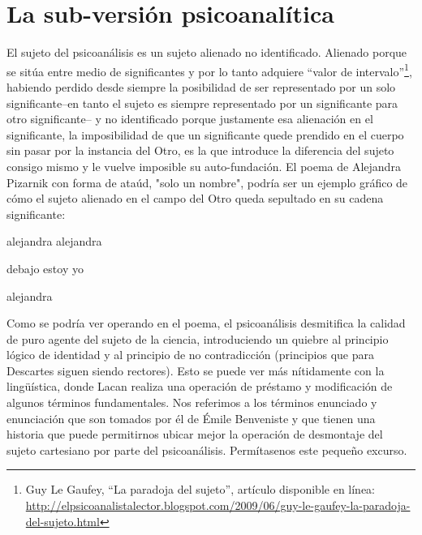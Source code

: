 \documentclass{book}
\begin{document}
\section{La sub-versión psicoanalítica}

El sujeto del psicoanálisis es un sujeto alienado no identificado.
Alienado porque se sitúa entre medio de significantes y por lo tanto
adquiere \enquote{valor de intervalo}\footnote{Guy Le Gaufey, \enquote{La paradoja del
  sujeto}, artículo disponible en línea:
  \url{http://elpsicoanalistalector.blogspot.com/2009/06/guy-le-gaufey-la-paradoja-del-sujeto.html}},
habiendo perdido desde siempre la posibilidad de ser representado por un
solo significante--en tanto el sujeto es siempre representado por un
significante para otro significante-- y no identificado porque
justamente esa alienación en el significante, la imposibilidad de que un
significante quede prendido en el cuerpo sin pasar por la instancia del
Otro, es la que introduce la diferencia del sujeto consigo mismo y le
vuelve imposible su auto-fundación. El poema de Alejandra Pizarnik con
forma de ataúd, "solo un nombre", podría ser un ejemplo gráfico de cómo
el sujeto alienado en el campo del Otro queda sepultado en su cadena
significante:

alejandra alejandra

debajo estoy yo

alejandra

Como se podría ver operando en el poema, el psicoanálisis desmitifica la
calidad de puro agente del sujeto de la ciencia, introduciendo un
quiebre al principio lógico de identidad y al principio de no
contradicción (principios que para Descartes siguen siendo rectores).
Esto se puede ver más nítidamente con la lingüística, donde Lacan
realiza una operación de préstamo y modificación de algunos términos
fundamentales. Nos referimos a los términos enunciado y enunciación que
son tomados por él de Émile Benveniste y que tienen una historia que
puede permitirnos ubicar mejor la operación de desmontaje del sujeto
cartesiano por parte del psicoanálisis. Permítasenos este pequeño
excurso.
\end{document}
